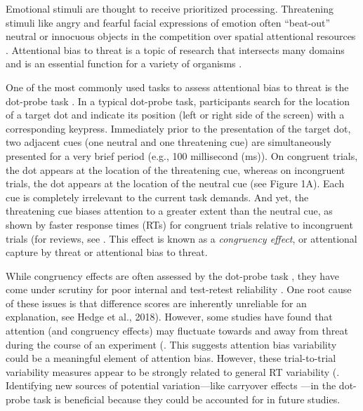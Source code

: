 \documentclass{article}
\begin{document}
	Emotional stimuli are thought to receive prioritized processing. Threatening stimuli like {\color{4472C4}angry and fearful facial }expressions of emotion often “beat-out” neutral or innocuous objects \textcite{[object Object], [object Object]} in the competition over spatial attentional resources \textcite{[object Object]}. Attentional bias to threat is a topic of research that intersects many domains and is an essential function for a variety of organisms \textcite{[object Object]}.



	One of the most commonly used tasks to assess attentional bias to threat is the dot-probe task \textcite{[object Object]}. In a typical dot-probe task, participants search for the location of a target dot and indicate its position (left or right side of the screen) with a corresponding keypress. Immediately prior to the presentation of the target dot, two adjacent cues (one neutral and one threatening cue) are simultaneously presented for a very brief period (e.g., 100 millisecond (ms)). On congruent trials, the dot appears at the location of the threatening cue, whereas on incongruent trials, the dot appears at the location of the neutral cue (see Figure 1A). Each cue is completely irrelevant to the current task demands. {\color{4472C4}And yet, the threatening cue biases attention to a greater extent than the neutral cue, as shown by faster response times (RTs) for congruent trials relative to incongruent trials (for reviews, see }\textcite{[object Object], [object Object]}{\color{4472C4}. }This effect is known as a \emph{congruency effect}, or attentional capture by threat or attentional bias to threat.



	While congruency effects are often assessed by the dot-probe task \textcite{[object Object], [object Object]}, they have come under scrutiny for poor internal and test-retest reliability \textcite{[object Object], [object Object]}. One root cause of these issues is that difference scores are inherently unreliable \textcite{[object Object]}{\color{4472C4}for an explanation, see} Hedge et al., 2018). However, some studies have found that attention (and congruency effects) may fluctuate towards and away from threat during the course of an experiment (\textcite{[object Object]}. This suggests attention bias variability could be a meaningful element of attention bias. However, these trial-to-trial variability measures appear to be strongly related to general RT variability (\textcite{[object Object], [object Object]}. Identifying new sources of potential variation—like carryover effects —in the dot-probe task is beneficial because they could be accounted for in future studies.
\end{document}

